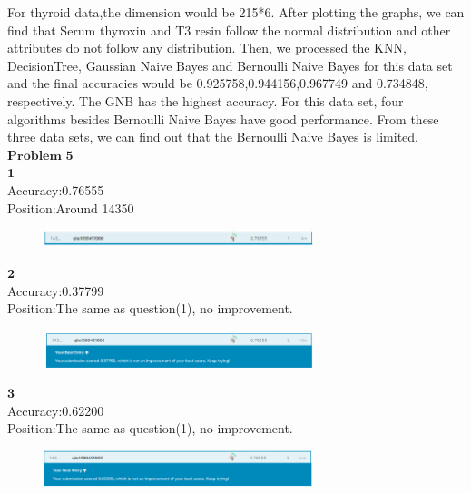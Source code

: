 \documentclass[12pt]{article}
\begin{document}
For thyroid data,the dimension would be 215*6. After plotting the graphs, we can find that Serum thyroxin and T3 resin follow the normal distribution and other attributes do not follow any distribution. Then, we processed the KNN, DecisionTree, Gaussian Naive Bayes and Bernoulli Naive Bayes for this data set and the final accuracies would be 0.925758,0.944156,0.967749 and 0.734848, respectively. The GNB has the highest accuracy. For this data set, four algorithms besides Bernoulli Naive Bayes have good performance. From these three data sets, we can find out that the Bernoulli Naive Bayes is limited.\\

$\textbf{Problem 5}$\\

$\textbf{1}$\\

Accuracy:0.76555\\

Position:Around 14350

\begin{figure}[H] 
\centering 
\includegraphics[width=0.7\textwidth]{sc1} 
\end{figure}

$\textbf{2}$\\

Accuracy:0.37799\\

Position:The same as question(1), no improvement.

\begin{figure}[H] 
\centering 
\includegraphics[width=0.7\textwidth]{sc2} 
\end{figure}

$\textbf{3}$\\

Accuracy:0.62200\\

Position:The same as question(1), no improvement.

\begin{figure}[H] 
\centering 
\includegraphics[width=0.7\textwidth]{sc3} 
\end{figure}
\end{document}
